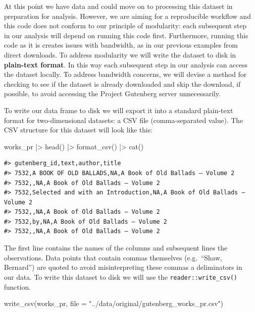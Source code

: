 \documentclass[
  letterpaper,
]{scrbook}
\newenvironment{Shaded}{\begin{snugshade}}{\end{snugshade}}
\newcommand{\AttributeTok}[1]{\textcolor[rgb]{0.00,0.00,0.00}{#1}}
\newcommand{\FunctionTok}[1]{\textcolor[rgb]{0.00,0.00,0.00}{#1}}
\newcommand{\NormalTok}[1]{\textcolor[rgb]{0.00,0.00,0.00}{#1}}
\newcommand{\SpecialCharTok}[1]{\textcolor[rgb]{0.00,0.00,0.00}{#1}}
\newcommand{\StringTok}[1]{\textcolor[rgb]{0.00,0.00,0.00}{#1}}
\begin{document}
At this point we have data and could move on to processing this dataset
in preparation for analysis. However, we are aiming for a reproducible
workflow and this code does not conform to our principle of modularity:
each subsequent step in our analysis will depend on running this code
first. Furthermore, running this code as it is creates issues with
bandwidth, as in our previous examples from direct downloads. To address
modularity we will write the dataset to disk in \textbf{plain-text
format}. In this way each subsequent step in our analysis can access the
dataset locally. To address bandwidth concerns, we will devise a method
for checking to see if the dataset is already downloaded and skip the
download, if possible, to avoid accessing the Project Gutenberg server
unnecessarily.

To write our data frame to disk we will export it into a standard
plain-text format for two-dimensional datasets: a CSV file
(comma-separated value). The CSV structure for this dataset will look
like this:

\begin{Shaded}
\begin{Highlighting}[]
\NormalTok{works\_pr }\SpecialCharTok{|\textgreater{}} \FunctionTok{head}\NormalTok{() }\SpecialCharTok{|\textgreater{}} \FunctionTok{format\_csv}\NormalTok{() }\SpecialCharTok{|\textgreater{}} \FunctionTok{cat}\NormalTok{()}
\end{Highlighting}
\end{Shaded}

\begin{verbatim}
#> gutenberg_id,text,author,title
#> 7532,A BOOK OF OLD BALLADS,NA,A Book of Old Ballads — Volume 2
#> 7532,,NA,A Book of Old Ballads — Volume 2
#> 7532,Selected and with an Introduction,NA,A Book of Old Ballads — Volume 2
#> 7532,,NA,A Book of Old Ballads — Volume 2
#> 7532,by,NA,A Book of Old Ballads — Volume 2
#> 7532,,NA,A Book of Old Ballads — Volume 2
\end{verbatim}

The first line contains the names of the columns and subsequent lines
the observations. Data points that contain commas themselves
(e.g.~``Shaw, Bernard'') are quoted to avoid misinterpreting these
commas a deliminators in our data. To write this dataset to disk we will
use the \texttt{reader::write\_csv()} function.

\begin{Shaded}
\begin{Highlighting}[]
\FunctionTok{write\_csv}\NormalTok{(works\_pr, }\AttributeTok{file =} \StringTok{"../data/original/gutenberg\_works\_pr.csv"}\NormalTok{)}
\end{Highlighting}
\end{Shaded}
\end{document}
